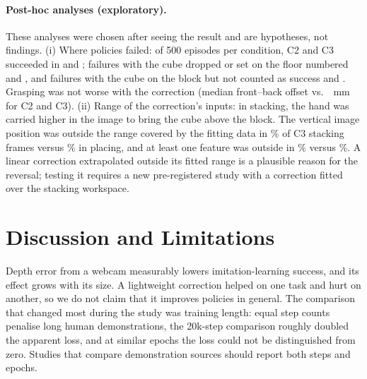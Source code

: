 \documentclass[10pt]{article}
\newcommand{\condII}{C2}
\newcommand{\condIII}{C3}
\begin{document}
\paragraph{Post-hoc analyses (exploratory).}
These analyses were chosen after seeing the result and are hypotheses, not findings.
(i) Where policies failed: of 500 episodes per condition, \condII{} and \condIII{} succeeded in \stageTwoSucc{} and \stageThreeSucc; failures with the cube dropped or set on the floor numbered \stageTwoFloor{} and \stageThreeFloor, and failures with the cube on the block but not counted as success \stageTwoOnbase{} and \stageThreeOnbase.
Grasping was not worse with the correction (median front--back offset \graspStackTwo{} vs.\ \graspStackThree{}~mm for \condII{} and \condIII).
(ii) Range of the correction's inputs: in stacking, the hand was carried higher in the image to bring the cube above the block. The vertical image position was outside the range covered by the fitting data in \outStack\% of \condIII{} stacking frames versus \outPlace\% in placing, and at least one feature was outside in \outAnyStack\% versus \outAnyPlace\%.
A linear correction extrapolated outside its fitted range is a plausible reason for the reversal; testing it requires a new pre-registered study with a correction fitted over the stacking workspace.

\section{Discussion and Limitations}

Depth error from a webcam measurably lowers imitation-learning success, and its effect grows with its size.
A lightweight correction helped on one task and hurt on another, so we do not claim that it improves policies in general.
The comparison that changed most during the study was training length: equal step counts penalise long human demonstrations, the 20k-step comparison roughly doubled the apparent loss, and at similar epochs the loss could not be distinguished from zero.
Studies that compare demonstration sources should report both steps and epochs.
\end{document}
